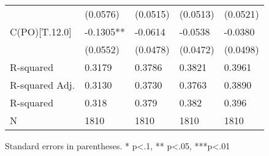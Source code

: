 \begin{table}
\begin{center}
\begin{tabular}{lllll}
                         & (0.0576)   & (0.0515)   & (0.0513)   & (0.0521)    \\
C(PO)[T.12.0]            & -0.1305**  & -0.0614    & -0.0538    & -0.0380     \\
                         & (0.0552)   & (0.0478)   & (0.0472)   & (0.0498)    \\
R-squared                & 0.3179     & 0.3786     & 0.3821     & 0.3961      \\
R-squared Adj.           & 0.3130     & 0.3730     & 0.3763     & 0.3890      \\
R-squared                & 0.318      & 0.379      & 0.382      & 0.396       \\
N                        & 1810       & 1810       & 1810       & 1810        \\
\hline
\end{tabular}
\end{center}
\end{table}
\bigskip
Standard errors in parentheses. \newline 
* p<.1, ** p<.05, ***p<.01